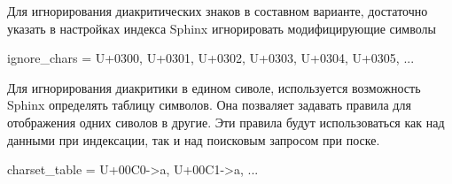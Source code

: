 Для игнорирования диакритических знаков в составном варианте, достаточно указать в настройках индекса Sphinx игнорировать модифицирующие символы

ignore\_chars = U+0300, U+0301, U+0302, U+0303, U+0304, U+0305, ...

Для игнорирования диакритики в едином сиволе, используется возможность Sphinx определять таблицу символов. Она позваляет задавать правила для отображения одних сиволов в другие.
Эти правила будут использоваться как над данными при индексации, так и над поисковым запросом при поске.

charset\_table = U+00C0->a, U+00C1->a, ...


